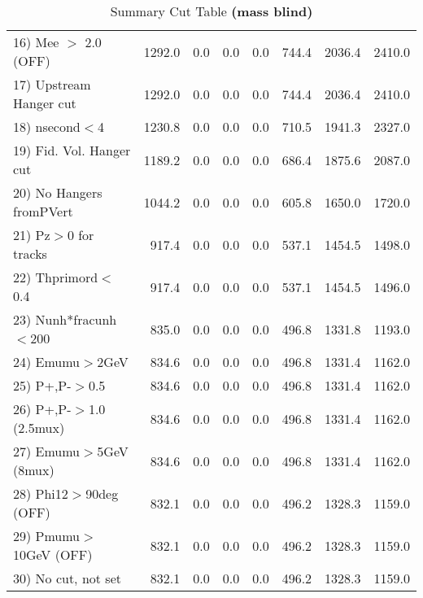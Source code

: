 \begin{table}[h!]
{{\begin{tabular}{||l||r|r|r|r|r||r||r||}
 16) Mee $>$ 2.0  (OFF)   &    1292.0 &       0.0 &       0.0 &       0.0 &     744.4 &    2036.4 &    2410.0 \\
 17) Upstream Hanger cut  &    1292.0 &       0.0 &       0.0 &       0.0 &     744.4 &    2036.4 &    2410.0 \\
 18) nsecond$<$4          &    1230.8 &       0.0 &       0.0 &       0.0 &     710.5 &    1941.3 &    2327.0 \\
 19) Fid. Vol. Hanger cut &    1189.2 &       0.0 &       0.0 &       0.0 &     686.4 &    1875.6 &    2087.0 \\
 20) No Hangers fromPVert &    1044.2 &       0.0 &       0.0 &       0.0 &     605.8 &    1650.0 &    1720.0 \\
 21) Pz$>$0 for tracks    &     917.4 &       0.0 &       0.0 &       0.0 &     537.1 &    1454.5 &    1498.0 \\
 22) Thprimord$<$0.4      &     917.4 &       0.0 &       0.0 &       0.0 &     537.1 &    1454.5 &    1496.0 \\
 23) Nunh*fracunh$<$200   &     835.0 &       0.0 &       0.0 &       0.0 &     496.8 &    1331.8 &    1193.0 \\
 24) Emumu$>$2GeV         &     834.6 &       0.0 &       0.0 &       0.0 &     496.8 &    1331.4 &    1162.0 \\
 25) P+,P-$>$0.5          &     834.6 &       0.0 &       0.0 &       0.0 &     496.8 &    1331.4 &    1162.0 \\
 26) P+,P-$>$1.0 (2.5mux) &     834.6 &       0.0 &       0.0 &       0.0 &     496.8 &    1331.4 &    1162.0 \\
 27) Emumu$>$5GeV  (8mux) &     834.6 &       0.0 &       0.0 &       0.0 &     496.8 &    1331.4 &    1162.0 \\
 28) Phi12$>$90deg  (OFF) &     832.1 &       0.0 &       0.0 &       0.0 &     496.2 &    1328.3 &    1159.0 \\
 29) Pmumu$>$10GeV  (OFF) &     832.1 &       0.0 &       0.0 &       0.0 &     496.2 &    1328.3 &    1159.0 \\
 30) No cut, not set      &     832.1 &       0.0 &       0.0 &       0.0 &     496.2 &    1328.3 &    1159.0 \\
 \hline
 \hline
 \end{tabular}
 \caption{Summary Cut Table \textbf{ (mass blind)}}
 \label{tab-sumcut}
 }}
 \end{table}
 \endinput
